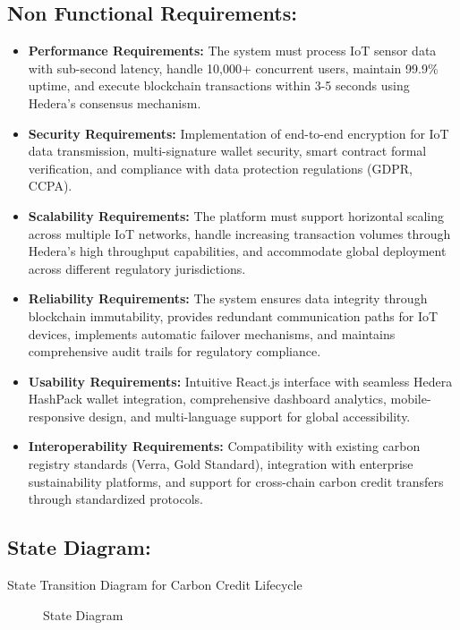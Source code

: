 \documentclass[oneside,a4paper,12pt]{book}
\begin{document}
\subsection{Non Functional Requirements:}
\begin{itemize}
    \item \textbf{Performance Requirements:} The system must process IoT sensor data with sub-second latency, handle 10,000+ concurrent users, maintain 99.9\% uptime, and execute blockchain transactions within 3-5 seconds using Hedera's consensus mechanism.
    
    \item \textbf{Security Requirements:} Implementation of end-to-end encryption for IoT data transmission, multi-signature wallet security, smart contract formal verification, and compliance with data protection regulations (GDPR, CCPA).
    
    \item \textbf{Scalability Requirements:} The platform must support horizontal scaling across multiple IoT networks, handle increasing transaction volumes through Hedera's high throughput capabilities, and accommodate global deployment across different regulatory jurisdictions.
    
    \item \textbf{Reliability Requirements:} The system ensures data integrity through blockchain immutability, provides redundant communication paths for IoT devices, implements automatic failover mechanisms, and maintains comprehensive audit trails for regulatory compliance.
    
    \item \textbf{Usability Requirements:} Intuitive React.js interface with seamless Hedera HashPack wallet integration, comprehensive dashboard analytics, mobile-responsive design, and multi-language support for global accessibility.
    
    \item \textbf{Interoperability Requirements:} Compatibility with existing carbon registry standards (Verra, Gold Standard), integration with enterprise sustainability platforms, and support for cross-chain carbon credit transfers through standardized protocols.
\end{itemize} 

\subsection{State Diagram:}	
State Transition Diagram for Carbon Credit Lifecycle\\
\begin{center}
    \begin{figure}[!htbp]
        \centering
      \caption{State Diagram}
      \label{fig:usecase}
    \end{figure}
\end{center}  
\end{document}
